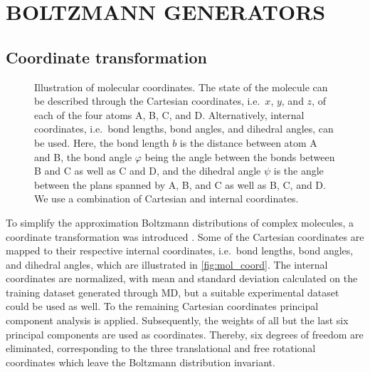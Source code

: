 \documentclass[twoside]{article}
\begin{document}
\section{BOLTZMANN GENERATORS}

\subsection{Coordinate transformation}
\label{sec:coord_transform}

\begin{figure}[h]
	\centering
	\caption{Illustration of molecular coordinates. The state of the molecule can be described through the Cartesian coordinates, i.e.\ $x$, $y$, and $z$, of each of the four atoms A, B, C, and D. Alternatively, internal coordinates, i.e.\ bond lengths, bond angles, and dihedral angles, can be used. Here, the bond length $b$ is the distance between atom A and B, the bond angle $\varphi$ being the angle between the bonds between B and C as well as C and D, and the dihedral angle $\psi$ is the angle between the plans spanned by A, B, and C as well as B, C, and D. We use a combination of Cartesian and internal coordinates.}
	\label{fig:mol_coord}
\end{figure}

To simplify the approximation Boltzmann distributions of complex molecules, a coordinate transformation was introduced \citep{Noe2019}. Some of the Cartesian coordinates are mapped to their respective internal coordinates, i.e.\ bond lengths, bond angles, and dihedral angles, which are illustrated in \autoref{fig:mol_coord}. The internal coordinates are normalized, with mean and standard deviation calculated on the training dataset generated through MD, but a suitable experimental dataset could be used as well. To the remaining Cartesian coordinates principal component analysis is applied. Subsequently, the weights of all but the last six principal components are used as coordinates. Thereby, six degrees of freedom are eliminated, corresponding to the three translational and free rotational coordinates which leave the Boltzmann distribution invariant.
\end{document}
